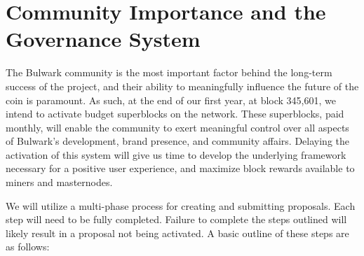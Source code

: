 \documentclass[11pt,a4paperpaper,]{report}
\begin{document}
\section{Community Importance and the Governance
System}\label{community-importance-and-the-governance-system}

The Bulwark community is the most important factor behind the long-term
success of the project, and their ability to meaningfully influence the
future of the coin is paramount. As such, at the end of our first year,
at block 345,601, we intend to activate budget superblocks on the
network. These superblocks, paid monthly, will enable the community to
exert meaningful control over all aspects of Bulwark's development,
brand presence, and community affairs. Delaying the activation of this
system will give us time to develop the underlying framework necessary
for a positive user experience, and maximize block rewards available to
miners and masternodes.

We will utilize a multi-phase process for creating and submitting
proposals. Each step will need to be fully completed. Failure to
complete the steps outlined will likely result in a proposal not being
activated. A basic outline of these steps are as follows:
\end{document}
